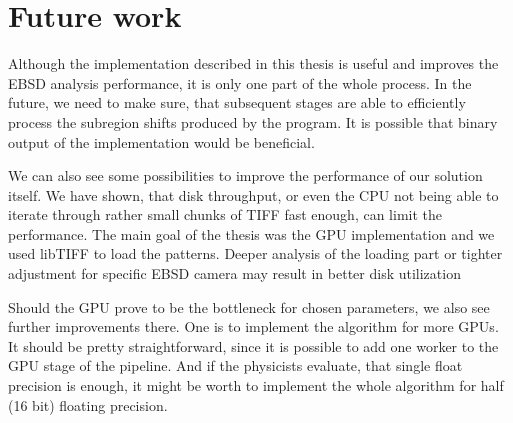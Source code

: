 \section*{Future work}

Although the implementation described in this thesis is useful and improves the EBSD analysis performance, it is only one part of the whole process. In the future, we need to make sure, that subsequent stages are able to efficiently process the subregion shifts produced by the program. It is possible that binary output of the implementation would be beneficial.

We can also see some possibilities to improve the performance of our solution itself. We have shown, that disk throughput, or even the CPU not being able to iterate through rather small chunks of TIFF fast enough, can limit the performance. The main goal of the thesis was the GPU implementation and we used libTIFF to load the patterns. Deeper analysis of the loading part or tighter adjustment for specific EBSD camera may result in better disk utilization

Should the GPU prove to be the bottleneck for chosen parameters, we also see further improvements there. One is to implement the algorithm for more GPUs. It should be pretty straightforward, since it is possible to add one worker to the GPU stage of the pipeline. And if the physicists evaluate, that single float precision is enough, it might be worth to implement the whole algorithm for half (16 bit) floating precision. 
